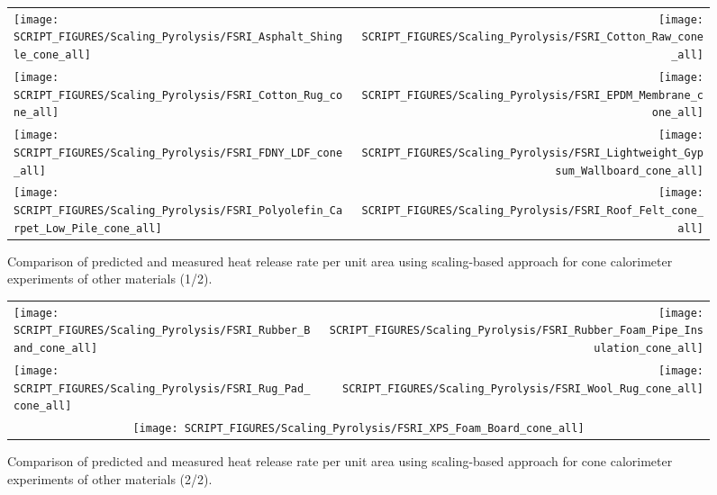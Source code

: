 \begin{figure}[p]
\begin{tabular*}{\textwidth}{l@{\extracolsep{\fill}}r}
\texttt{[image: SCRIPT\_FIGURES/Scaling\_Pyrolysis/FSRI\_Asphalt\_Shingle\_cone\_all]} &
\texttt{[image: SCRIPT\_FIGURES/Scaling\_Pyrolysis/FSRI\_Cotton\_Raw\_cone\_all]} \\
\texttt{[image: SCRIPT\_FIGURES/Scaling\_Pyrolysis/FSRI\_Cotton\_Rug\_cone\_all]} &
\texttt{[image: SCRIPT\_FIGURES/Scaling\_Pyrolysis/FSRI\_EPDM\_Membrane\_cone\_all]} \\
\texttt{[image: SCRIPT\_FIGURES/Scaling\_Pyrolysis/FSRI\_FDNY\_LDF\_cone\_all]} &
\texttt{[image: SCRIPT\_FIGURES/Scaling\_Pyrolysis/FSRI\_Lightweight\_Gypsum\_Wallboard\_cone\_all]} \\
\texttt{[image: SCRIPT\_FIGURES/Scaling\_Pyrolysis/FSRI\_Polyolefin\_Carpet\_Low\_Pile\_cone\_all]} &
\texttt{[image: SCRIPT\_FIGURES/Scaling\_Pyrolysis/FSRI\_Roof\_Felt\_cone\_all]} \\
\end{tabular*}
\caption[HRRPUA of FSRI materials using scaling model, other materials]
{Comparison of predicted and measured heat release rate per unit area using scaling-based approach for cone calorimeter experiments of other materials (1/2).}
\label{FSRI_Materials_others1}
\end{figure}

\begin{figure}[p]
\begin{tabular*}{\textwidth}{l@{\extracolsep{\fill}}r}
\texttt{[image: SCRIPT\_FIGURES/Scaling\_Pyrolysis/FSRI\_Rubber\_Band\_cone\_all]} &
\texttt{[image: SCRIPT\_FIGURES/Scaling\_Pyrolysis/FSRI\_Rubber\_Foam\_Pipe\_Insulation\_cone\_all]} \\
\texttt{[image: SCRIPT\_FIGURES/Scaling\_Pyrolysis/FSRI\_Rug\_Pad\_cone\_all]} &
\texttt{[image: SCRIPT\_FIGURES/Scaling\_Pyrolysis/FSRI\_Wool\_Rug\_cone\_all]} \\
\multicolumn{2}{c}{\texttt{[image: SCRIPT\_FIGURES/Scaling\_Pyrolysis/FSRI\_XPS\_Foam\_Board\_cone\_all]}}
\end{tabular*}
\caption[HRRPUA of FSRI materials using scaling model, other materials]
{Comparison of predicted and measured heat release rate per unit area using scaling-based approach for cone calorimeter experiments of other materials (2/2).}
\label{FSRI_Materials_others2}
\end{figure}

\clearpage

